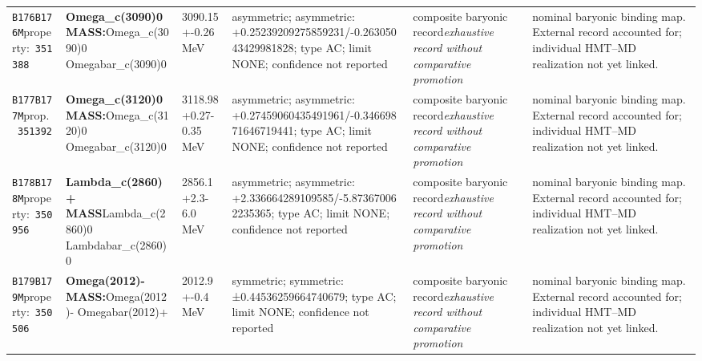 \begin{landscape}
\begin{longtable}{L{1.85cm}L{4.45cm}L{2.35cm}L{4.05cm}L{3.35cm}L{7.15cm}}
\texttt{B176}\newline \texttt{B176M}\newline property:\ \texttt{351388} & \textbf{Omega\_\allowbreak{}c(3090)0 MASS:}\newline Omega\_\allowbreak{}c(3090)0 \textbar{}\allowbreak{} Omegabar\_\allowbreak{}c(3090)0 & 3090.15+-0.26\,MeV & asymmetric; asymmetric: +0.25239209275859231/-0.26305043429981828; type AC; limit NONE; confidence not reported & composite baryonic record\newline \emph{exhaustive record without comparative promotion} & nominal baryonic binding map. External record accounted for; individual HMT--MD realization not yet linked. \\
\texttt{B177}\newline \texttt{B177M}\newline prop.\ \texttt{351392} & \textbf{Omega\_\allowbreak{}c(3120)0 MASS:}\newline Omega\_\allowbreak{}c(3120)0 \textbar{}\allowbreak{} Omegabar\_\allowbreak{}c(3120)0 & 3118.98+0.27-0.35\,MeV & asymmetric; asymmetric: +0.27459060435491961/-0.34669871646719441; type AC; limit NONE; confidence not reported & composite baryonic record\newline \emph{exhaustive record without comparative promotion} & nominal baryonic binding map. External record accounted for; individual HMT--MD realization not yet linked. \\
\texttt{B178}\newline \texttt{B178M}\newline property:\ \texttt{350956} & \textbf{Lambda\_\allowbreak{}c(2860)+ MASS}\newline Lambda\_\allowbreak{}c(2860)0 \textbar{}\allowbreak{} Lambdabar\_\allowbreak{}c(2860)0 & 2856.1+2.3-6.0\,MeV & asymmetric; asymmetric: +2.336664289109585/-5.873670062235365; type AC; limit NONE; confidence not reported & composite baryonic record\newline \emph{exhaustive record without comparative promotion} & nominal baryonic binding map. External record accounted for; individual HMT--MD realization not yet linked. \\
\texttt{B179}\newline \texttt{B179M}\newline property:\ \texttt{350506} & \textbf{Omega(2012)- MASS:}\newline Omega(2012)- \textbar{}\allowbreak{} Omegabar(2012)+ & 2012.9+-0.4\,MeV & symmetric; symmetric: ±0.44536259664740679; type AC; limit NONE; confidence not reported & composite baryonic record\newline \emph{exhaustive record without comparative promotion} & nominal baryonic binding map. External record accounted for; individual HMT--MD realization not yet linked. \\

\end{longtable}
\end{landscape}
